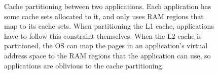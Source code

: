 \begin{figure}[hbt]
  \caption{
    Cache partitioning between two applications. Each application has some
    cache sets allocated to it, and only uses RAM regions that map to its cache
    sets. When partitioning the L1 cache, applications have to follow this
    constraint themselves. When the L2 cache is partitioned, the OS can map the
    pages in an application's virtual address space to the RAM regions that the
    application can use, so applications are oblivious to the cache
    partitioning.
  }
  \label{fig:cache_partitions}
\end{figure}
